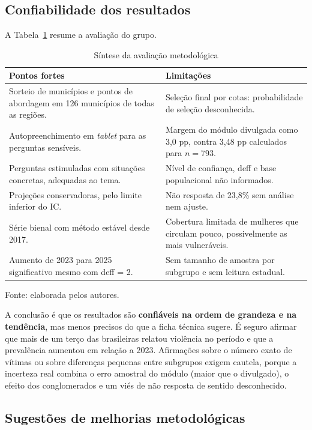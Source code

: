 \documentclass[12pt,a4paper]{article}
\newcommand{\fonte}[1]{%
  \vspace{-2mm}
  \begin{center}\footnotesize Fonte: #1\end{center}
}
\begin{document}
\subsection{Confiabilidade dos resultados}

A Tabela~\ref{tab:sintese} resume a avaliação do grupo.

\begin{table}[H]
\centering
\caption{Síntese da avaliação metodológica}
\label{tab:sintese}
\small
\begin{tabularx}{\textwidth}{XX}
\toprule
\textbf{Pontos fortes} & \textbf{Limitações} \\
\midrule
Sorteio de municípios e pontos de abordagem em 126 municípios de todas as regiões. & Seleção final por cotas: probabilidade de seleção desconhecida. \\
\addlinespace
Autopreenchimento em \textit{tablet} para as perguntas sensíveis. & Margem do módulo divulgada como 3,0 pp, contra 3,48 pp calculados para $n = 793$. \\
\addlinespace
Perguntas estimuladas com situações concretas, adequadas ao tema. & Nível de confiança, deff e base populacional não informados. \\
\addlinespace
Projeções conservadoras, pelo limite inferior do IC. & Não resposta de 23,8\% sem análise nem ajuste. \\
\addlinespace
Série bienal com método estável desde 2017. & Cobertura limitada de mulheres que circulam pouco, possivelmente as mais vulneráveis. \\
\addlinespace
Aumento de 2023 para 2025 significativo mesmo com deff = 2. & Sem tamanho de amostra por subgrupo e sem leitura estadual. \\
\bottomrule
\end{tabularx}
\fonte{elaborada pelos autores.}
\end{table}

A conclusão é que os resultados são \textbf{confiáveis na ordem de grandeza e na tendência}, mas menos precisos do que a ficha técnica sugere. É seguro afirmar que mais de um terço das brasileiras relatou violência no período e que a prevalência aumentou em relação a 2023. Afirmações sobre o número exato de vítimas ou sobre diferenças pequenas entre subgrupos exigem cautela, porque a incerteza real combina o erro amostral do módulo (maior que o divulgado), o efeito dos conglomerados e um viés de não resposta de sentido desconhecido.

\subsection{Sugestões de melhorias metodológicas}
\end{document}
